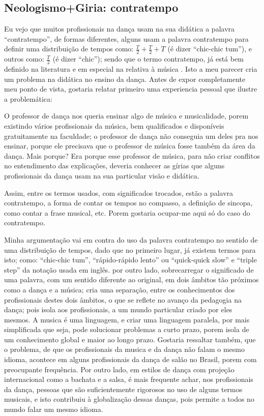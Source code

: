 \subsection{Neologismo+Giria: contratempo}
Eu vejo que muitos profissionais na dança usam na sua didática a palavra ``contratempo'', 
de formas diferentes, 
alguns usam a palavra contratempo para definir uma distribuição de tempos como: 
$\frac{T}{2}+\frac{T}{2}+T$ (é dizer ``chic-chic tum''), 
e outros como: $\frac{T}{2}$ (é dizer ``chic''); 
sendo que o termo contratempo, 
já está bem definido na literatura \cite{priberamcontratempo} e em especial na relativa à música \cite[pp. 46]{alves2004teoria}.
Isto a meu parecer cria um problema na didática no ensino da dança. 
Antes de expor completamente meu ponto de vista, gostaria relatar primeiro uma experiencia pessoal que ilustre a problemática: 
\begin{citando}%
O professor de dança nos queria ensinar algo de música e musicalidade, 
porem existindo vários profissionais da música, bem qualificados e disponíveis gratuitamente na faculdade; 
o professor de dança não conseguia um deles pra nos ensinar,
porque ele precisava que o professor de música fosse também da área da dança. 
Mais porque? Era porque esse professor de música, 
para não criar conflitos no entendimento das explicações, 
deveria conhecer as gírias que alguns profissionais da dança usam na sua particular visão e didática. 
\end{citando}%
Assim, entre os termos usados, com significados trocados, estão a palavra contratempo, 
a forma de contar os tempos no compasso, a definição de sincopa, como contar a frase musical, etc. 
Porem gostaria ocupar-me aqui só do caso do contratempo. 

Minha argumentação vai em contra do uso da palavra contratempo no sentido de uma distribuição de tempos, 
dado que no primeiro lugar, já existem termos para isto; como: ``chic-chic tum'', 
``rápido-rápido lento'' ou ``quick-quick slow'' e ``triple step'' da notação usada em inglês.
por outro lado, sobrecarregar o significado de uma palavra, com um sentido diferente ao original, 
em dois âmbitos tão próximos como a dança e a música; cria uma separação, 
entre os conhecimentos dos profissionais destes dois âmbitos, o que se reflete no avanço da pedagogia na dança; 
pois isola aos profissionais, a um mundo particular criado por eles mesmos.  
A musica é uma linguagem, e criar uma linguagem paralela, por mais simplificada que seja, 
pode solucionar problemas a curto prazo, porem isola de um conhecimento global e maior ao longo prazo.
Gostaria ressaltar também, que o problema, de que os profissionais da musica e da dança não falam o mesmo idioma, 
acontece em alguns profissionais da dança de salão no Brasil, porem com preocupante frequência. 
Por outro lado, em estilos de dança com projeção internacional como a bachata e a salsa, 
é mais frequente achar, nos profissionais da dança, pessoas que são suficientemente rigorosos  no uso de alguns termos musicais, 
e isto contribuiu à globalização dessas danças, pois permite a todos no mundo falar um mesmo idioma.


